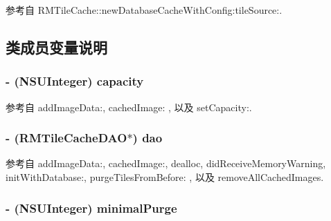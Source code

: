 参考自 R\-M\-Tile\-Cache\-::new\-Database\-Cache\-With\-Config\-:tile\-Source\-:.



\subsection{类成员变量说明}
\hypertarget{interface_r_m_database_cache_afa03a8db5ae9ce39dcdfaaf4950198d0}{
\subsubsection[{capacity}]{\setlength{\rightskip}{0pt plus 5cm}-\/ (N\-S\-U\-Integer) capacity\hspace{0.3cm}{\ttfamily [protected]}}}\label{interface_r_m_database_cache_afa03a8db5ae9ce39dcdfaaf4950198d0}


参考自 add\-Image\-Data\-:, cached\-Image\-: , 以及 set\-Capacity\-:.

\hypertarget{interface_r_m_database_cache_a155c655a0a18d7fa99bae05faa17765c}{
\subsubsection[{dao}]{\setlength{\rightskip}{0pt plus 5cm}-\/ ({\bf R\-M\-Tile\-Cache\-D\-A\-O}$\ast$) dao\hspace{0.3cm}{\ttfamily [protected]}}}\label{interface_r_m_database_cache_a155c655a0a18d7fa99bae05faa17765c}


参考自 add\-Image\-Data\-:, cached\-Image\-:, dealloc, did\-Receive\-Memory\-Warning, init\-With\-Database\-:, purge\-Tiles\-From\-Before\-: , 以及 remove\-All\-Cached\-Images.

\hypertarget{interface_r_m_database_cache_af53a420e2e3f29269c0845a60efa3856}{
\subsubsection[{minimal\-Purge}]{\setlength{\rightskip}{0pt plus 5cm}-\/ (N\-S\-U\-Integer) minimal\-Purge\hspace{0.3cm}{\ttfamily [protected]}}}\label{interface_r_m_database_cache_af53a420e2e3f29269c0845a60efa3856}


